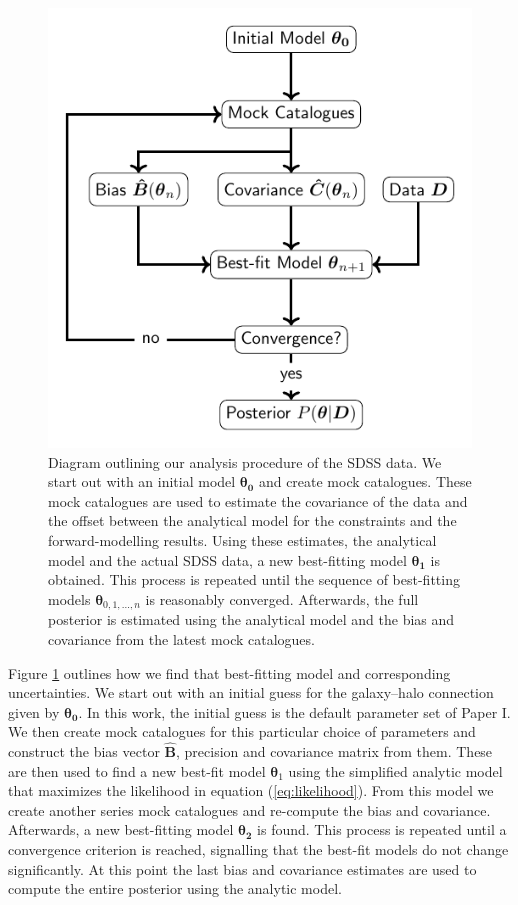 \documentclass[fleqn,usenatbib,useAMS]{mnras}
\begin{document}
\begin{figure}
	\centering
	\includegraphics{graph}
	\caption{Diagram outlining our analysis procedure of the SDSS data. We start out with an initial model $\boldsymbol{\theta_0}$ and create mock catalogues. These mock catalogues are used to estimate the covariance of the data and the offset between the analytical model for the constraints and the forward-modelling results. Using these estimates, the analytical model and the actual SDSS data, a new best-fitting model $\boldsymbol{\theta_1}$ is obtained. This process is repeated until the sequence of best-fitting models $\boldsymbol{\theta}_{0, 1, ..., n}$ is reasonably converged. Afterwards, the full posterior is estimated using the analytical model and the bias and covariance from the latest mock catalogues.}
	\label{fig:graph}
\end{figure}

Figure \ref{fig:graph} outlines how we find that best-fitting model and corresponding uncertainties. We start out with an initial guess for the galaxy--halo connection given by $\boldsymbol{\theta_0}$. In this work, the initial guess is the default parameter set of Paper I. We then create mock catalogues for this particular choice of parameters and construct the bias vector $\boldsymbol{\hat{B}}$, precision and covariance matrix from them. These are then used to find a new best-fit model $\boldsymbol{\theta}_1$ using the simplified analytic model that maximizes the likelihood in equation (\ref{eq:likelihood}). From this model we create another series mock catalogues and re-compute the bias and covariance. Afterwards, a new best-fitting model $\boldsymbol{\theta_2}$ is found. This process is repeated until a convergence criterion is reached, signalling that the best-fit models do not change significantly. At this point the last bias and covariance estimates are used to compute the entire posterior using the analytic model.
\end{document}
